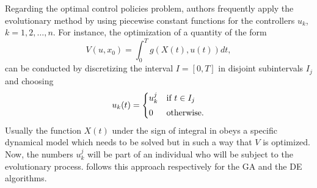   Regarding the optimal control policies problem, authors frequently apply the 
evolutionary method by using piecewise constant functions for the controllers 
$u_k$, $k=1,2,\dots,n$. For instance, the optimization of a
quantity of the form
\begin{equation}
  V(u, x_0) = 
    \int_0^T
      g(X(t), u(t)) dt,
\label{eq:Jaccion}
\end{equation}
can be conducted by discretizing the 
interval $I = [0,T]$ in disjoint subintervals $I_j$ and choosing  
\begin{equation}\label{DECrossover}
  u_{k}(t) =
  \begin{cases}
    u^j_{k} & \text{if $t \in I_j$}
      \vspace*{0.1cm}\\
      0 & \text{otherwise.}
  \end{cases}
\end{equation}
  Usually the function $X(t)$ under the sign of integral in 
obeys a specific dynamical model which needs to be solved but in such a way
that $V$ is optimized. Now, the numbers $u^j_{k}$ will be part of an 
individual who will be subject to the evolutionary process. 
\citet{Yan2008,Jang2018} follows this approach respectively for the GA and the 
DE algorithms.